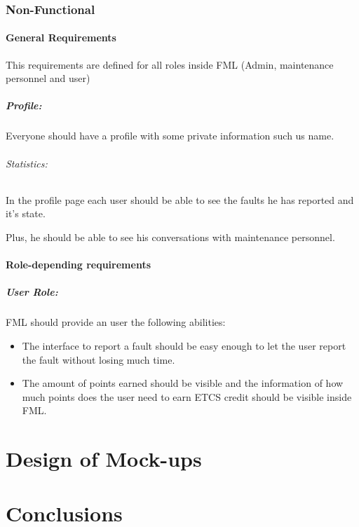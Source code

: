 \documentclass{report}
\begin{document}
\subsection{Non-Functional}

\subsubsection{General Requirements}

This requirements are defined for all roles inside FML (Admin, maintenance personnel and user)

\paragraph{Profile: } Everyone should have a profile with some private information such us name.
\subparagraph{Statistics: } In the profile page each user should be able to see the faults he has reported and it's state. 

Plus, he should be able to see his conversations with maintenance personnel.


\subsubsection{Role-depending requirements}

\paragraph{User Role: }
FML should provide an user the following abilities:
\begin{itemize}
\item The interface to report a fault should be easy enough to let the user report the fault without losing much time.
\item The amount of points earned should be visible and the information of how much points does the user need to earn ETCS credit should be visible inside FML.
\end{itemize}


\chapter{Design of Mock-ups}

\chapter{Conclusions}


\appendix
\end{document}
